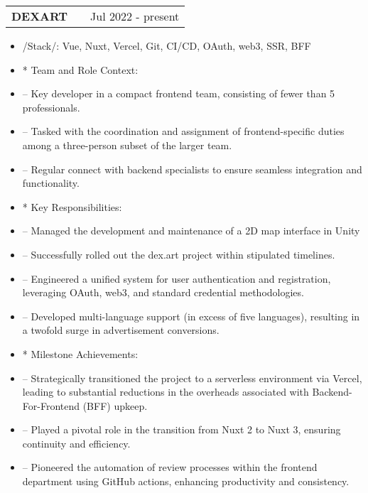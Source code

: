 \documentclass[a4paper,12pt]{article}
\makeatletter
\newenvironment{joblong}[2]
    {
    \begin{tabularx}{\linewidth}{@{}l X r@{}}
    \textbf{#1} & \hfill &  #2 \\[3.75pt]
    \end{tabularx}
    \begin{minipage}[t]{\linewidth}
    \begin{itemize}[nosep,after=\strut, leftmargin=1em, itemsep=3pt,label=--]
    }
    {
    \end{itemize}
    \end{minipage}    
    }
\makeatother
\begin{document}
\begin{joblong}{DEXART}{Jul 2022 - present}
  \item /Stack/: {Vue, Nuxt, Vercel, Git, CI/CD, OAuth, web3, SSR, BFF}
  \item [*] Team and Role Context:
  \item [--] Key developer in a compact frontend team, consisting of fewer than 5 professionals. 
  \item[--] Tasked with the coordination and assignment of frontend-specific duties among a three-person subset of the larger team.
  \item [--] Regular connect with backend specialists to ensure seamless integration and functionality.
  \item [*]Key Responsibilities:
  \item [--] Managed the development and maintenance of a 2D map interface in Unity
  \item [--] Successfully rolled out the dex.art project within stipulated timelines.
  \item [--] Engineered a unified system for user authentication and registration, leveraging OAuth, web3, and standard credential methodologies.
  \item [--] Developed multi-language support (in excess of five languages), resulting in a twofold surge in advertisement conversions.
  \item [*] Milestone Achievements:
  \item [--] Strategically transitioned the project to a serverless environment via Vercel, leading to substantial reductions in the overheads associated with Backend-For-Frontend (BFF) upkeep.
  \item [--] Played a pivotal role in the transition from Nuxt 2 to Nuxt 3, ensuring continuity and efficiency.
  \item [--] Pioneered the automation of review processes within the frontend department using GitHub actions, enhancing productivity and consistency.
\end{joblong}
\end{document}

